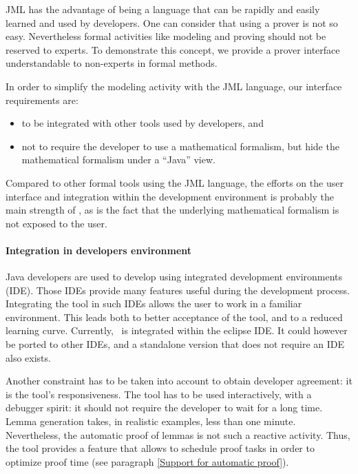 \label{Industrialisation}
JML has the advantage of being a language that can be rapidly and
easily learned and used by developers. One can consider that using a
prover is not so easy. Nevertheless formal activities like modeling
and proving should not be reserved to experts. To demonstrate this
concept, we provide a prover interface understandable to non-experts
in formal methods.

In order to simplify the modeling activity with the JML language, our
interface requirements are:
\begin{itemize}
 \item to be integrated with other tools used by developers, and
 \item not to require the developer to use a mathematical formalism,
    but hide the mathematical formalism under a ``Java'' view.
\end{itemize}
Compared to other formal tools using the JML language, the efforts on
the user interface and integration within the development
environment is probably the main strength of \JACK, as is the fact
that the underlying mathematical formalism is not exposed to the
user.
\paragraph{Integration in developers environment}
 Java developers are used to develop using integrated development
 environments (IDE).  Those IDEs provide many features useful during
 the development process.  Integrating the tool in such IDEs allows
 the user to work in a familiar environment.  This leads both to
 better acceptance of the tool, and to a reduced learning curve.
 Currently, \JACK\ is integrated within the eclipse IDE.  It could
 however be ported to other IDEs, and a standalone version that does
 not require an IDE also exists.

 Another constraint has to be taken into account to obtain developer
 agreement: it is the tool's responsiveness.  The tool has to be used
 interactively, with a debugger spirit: it should not require the
 developer to wait for a long time.  Lemma generation takes, in
 realistic examples, less
 than one minute. %
 Nevertheless, the automatic proof of lemmas is not such a reactive
 activity. Thus, the tool provides a feature that allows to schedule
 proof tasks in order to optimize proof time (see paragraph
 \ref{Support for automatic proof}).


